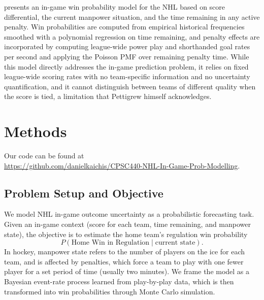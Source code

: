 \documentclass{article}
\begin{document}
\citet{pettigrew2015assessing} presents an in-game win probability model for the NHL based on score differential, the current manpower situation, and the time remaining in any active penalty. Win probabilities are computed from empirical historical frequencies smoothed with a polynomial regression on time remaining, and penalty effects are incorporated by computing league-wide power play and shorthanded goal rates per second and applying the Poisson PMF over remaining penalty time. While this model directly addresses the in-game prediction problem, it relies on fixed league-wide scoring rates with no team-specific information and no uncertainty quantification, and it cannot distinguish between teams of different quality when the score is tied, a limitation that Pettigrew himself acknowledges.

\section{Methods}
Our code can be found at \\\url{https://github.com/danielkaichis/CPSC440-NHL-In-Game-Prob-Modelling}.

\subsection{Problem Setup and Objective}
We model NHL in-game outcome uncertainty as a probabilistic forecasting task. Given an in-game context (score for each team, time remaining, and manpower state), the objective is
to estimate the home team's regulation win probability
\[
P(\text{Home Win in Regulation} \mid \text{current state}).
\]
In hockey, manpower state refers to the number of players on the ice for each team, and is affected by penalties, which force a team to play with one fewer player for a set period of time (usually two minutes). We frame the model as a Bayesian event-rate process learned from play-by-play data, which is then transformed into win probabilities through Monte Carlo simulation.
\end{document}
